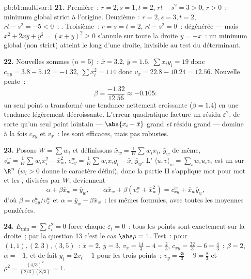 \begin{solution}{pb:b1:multivar:1}
\textbf{21.} Première~: $r = 2, s = 1, t = 2$, $rt - s^2 = 3 > 0$,
$r > 0$~: minimum global strict à l'origine. Deuxième~: $r = 2, s
= 3, t = 2$, $rt - s^2 = -5 < 0$~: . Troisième~: $r = s = t =
2$, $rt - s^2 = 0$~: dégénérée --- mais $x^2 + 2xy + y^2 = (x +
y)^2 \geq 0$ s'annule sur toute la droite $y = -x$~: un minimum
global (non strict) atteint le long d'une droite, invisible au
test du déterminant.

\textbf{22.} Nouvelles sommes ($n = 5$)~: $\bar x = 3.2$, $\bar y =
1.6$, $\sum x_iy_i = 19$ donc $c_{xy} = 3.8 - 5.12 = -1.32$,
$\sum x_i^2 = 114$ donc $v_x = 22.8 - 10.24 = 12.56$. Nouvelle
pente~:
\[
\beta = \frac{-1.32}{12.56} \approx -0.105 :
\]
un seul point a transformé une tendance nettement croissante
($\beta = 1.4$) en une tendance légèrement décroissante. L'erreur
quadratique facture un résidu $\varepsilon^2$, de sorte qu'un seul
point lointain --- $\abs{x_{i} - \bar x}$ grand \emph{et} résidu
grand --- domine à la fois $c_{xy}$ et $v_x$~: les 
sont efficaces, mais pas robustes.

\textbf{23.} Posons $W = \sum w_i$ et définissons $\bar x_w =
\frac1W\sum w_ix_i$, $\bar y_w$ de même, $v_x^w = \frac1W\sum
w_ix_i^2 - \bar x_w^2$, $c^w_{xy} = \frac1W\sum w_ix_iy_i - \bar
x_w\bar y_w$. L' $\langle u, v\rangle_w = \sum_i
w_iu_iv_i$ est un  sur $\R^n$ ($w_i > 0$ donne le
caractère défini), donc la partie II s'applique mot pour mot et
les , divisées par $W$, deviennent
\[
\alpha + \beta\bar x_w = \bar y_w,
\qquad
\alpha\bar x_w + \beta(v^w_x + \bar x_w^2) = c^w_{xy} + \bar
x_w\bar y_w ,
\]
d'où $\beta = c^w_{xy}/v^w_x$ et $\alpha = \bar y_w -
\beta\bar x_w$~: les mêmes formules, avec toutes les moyennes
pondérées.

\textbf{24.} $E_{\min} = \sum\varepsilon_i^2 = 0$ force chaque
$\varepsilon_i = 0$~: tous les points sont exactement sur la
droite~; par la question 13 c'est le cas $\abs\rho = 1$. Test~:
pour $(1,1), (2,3), (3,5)$~: $\bar x = 2$, $\bar y = 3$, $v_x =
\frac{14}3 - 4 = \frac23$, $c_{xy} = \frac{22}3 - 6 = \frac43$~:
$\beta = 2$, $\alpha = -1$, et de fait $y_i = 2x_i - 1$ pour les
trois points~; $v_y = \frac{35}3 - 9 = \frac83$ et $\rho^2 =
\frac{(4/3)^2}{(2/3)(8/3)} = 1$.


\end{solution}
